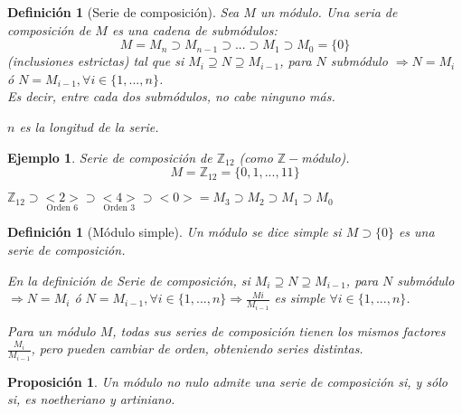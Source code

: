 \documentclass[11pt,a4paper]{article}
\theoremstyle{break}
\newtheorem{example}[theorem]{Ejemplo}
\newtheorem{definition}[theorem]{Definición}
\newtheorem{proposition}[theorem]{Proposición}
\begin{document}
\begin{definition}[Serie de composición]
Sea $M$ un módulo. Una seria de composición de $M$ es una cadena de submódulos:
$$M = M_{n} \supset M_{n-1} \supset ... \supset M_{1} \supset M_{0} = \{0\}$$
(inclusiones estrictas) tal que si $M_{i} \supseteq N \supseteq M_{i-1}$, para $N$ submódulo $\Rightarrow N = M_{i}$ ó $N = M_{i-1}, \forall i \in \{1, ..., n\}$. \\
Es decir, entre cada dos submódulos, no cabe ninguno más.

$n$ es la longitud de la serie.
\end{definition}

\begin{example}
Serie de composición de $\mathbb{Z}_{12}$ (como $\mathbb{Z}-$módulo).
$$M = \mathbb{Z}_{12} = \{0, 1, ..., 11\}$$

$\mathbb{Z}_{12} \supset \underset{\text{Orden 6}}{<2>} \supset \underset{\text{Orden 3}}{<4>} \supset <0> = M_{3} \supset M_{2} \supset M_{1} \supset M_{0}$
\end{example}

\begin{definition}[Módulo simple]
Un módulo se dice simple si $M \supset \{0\}$ es una serie de composición.

En la definición de Serie de composición, si $M_{i} \supseteq N \supseteq M_{i-1}$, para $N$ submódulo $\Rightarrow N = M_{i}$ ó $N = M_{i-1}, \forall i \in \{1, ..., n\} \Rightarrow \frac{M{i}}{M_{i-1}}$ es simple $\forall i \in \{1, ..., n\}$.

Para un módulo $M$, todas sus series de composición tienen los mismos factores $\frac{M_{i}}{M_{i-1}}$, pero pueden cambiar de orden, obteniendo series distintas.
\end{definition}

\begin{proposition}
Un módulo no nulo admite una serie de composición si, y sólo si, es noetheriano y artiniano.
\end{proposition}
\end{document}
